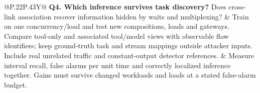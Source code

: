 \begin{table}[t]
\begin{tabularx}{\textwidth}{@{}P{.22\textwidth}P{.43\textwidth}Y@{}}
\textbf{Q4. Which inference survives task discovery?} Does cross-link association recover information hidden by waits and multiplexing? & Train on one concurrency/load and test new compositions, loads and gateways. Compare tool-only and associated tool/model views with observable flow identifiers; keep ground-truth task and stream mappings outside attacker inputs. Include real unrelated traffic and constant-output detector references. & Measure interval recall, false alarms per unit time and correctly localized inference together. Gains must survive changed workloads and loads at a stated false-alarm budget. \\
\bottomrule\end{tabularx}\end{table}
